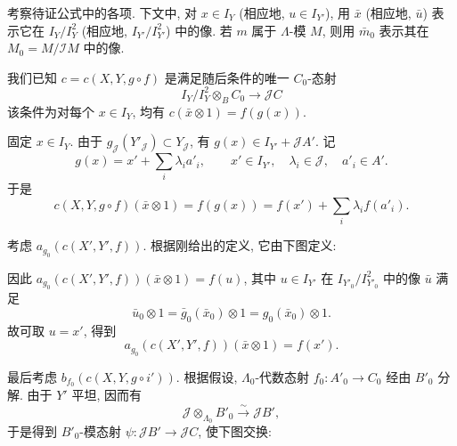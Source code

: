 \begin{center}
\end{center}

考察待证公式中的各项. 下文中, 对 \(x\in I_Y\)
(相应地, \(u\in I_{Y'}\)), 用 \(\bar x\) (相应地, \(\bar u\))
表示它在 \(I_Y/I_Y^2\) (相应地, \(I_{Y'}/I_{Y'}^2\)) 中的像.
若 \(m\) 属于 \(\Lambda\)-模 \(M\), 则用 \(\bar m_0\)
表示其在 \(M_0=M/\mathscr I M\) 中的像.

我们已知 \(c=c(X,Y,g\circ f)\) 是满足随后条件的唯一 \(C_0\)-态射
\[
 I_Y/I_Y^2\otimes_B C_0\longrightarrow\mathscr J C
\]
该条件为对每个 \(x\in I_Y\), 均有 \(c(\bar x\otimes1)=f(g(x))\).

固定 \(x\in I_Y\). 由于 \(g_{\mathscr J}(Y'_{\mathscr J})\subset
Y_{\mathscr J}\), 有 \(g(x)\in I_{Y'}+\mathscr J A'\). 记
\[
 g(x)=x'+\sum_i\lambda_i a'_i,
 \qquad x'\in I_{Y'},\quad \lambda_i\in\mathscr J,\quad a'_i\in A'.
\]
于是
\begin{equation*}
 \tag{1}\label{sga3:iii:proposition:4-13:equation:1}
 c(X,Y,g\circ f)(\bar x\otimes1)
 =f(g(x))=f(x')+\sum_i\lambda_i f(a'_i).
\end{equation*}

考虑 \(a_{g_0}(c(X',Y',f))\). 根据刚给出的定义, 它由下图定义:

\begin{center}
\end{center}

因此 \(a_{g_0}(c(X',Y',f))(\bar x\otimes1)=f(u)\),
其中 \(u\in I_{Y'}\) 在 \(I_{Y'_0}/I_{Y'_0}^2\) 中的像 \(\bar u\) 满足
\[
 \bar u_0\otimes1=\bar g_0(\bar x_0)\otimes1
 =g_0(\bar x_0)\otimes1.
\]
故可取 \(u=x'\), 得到
\begin{equation*}
 \tag{2}\label{sga3:iii:proposition:4-13:equation:2}
 a_{g_0}(c(X',Y',f))(\bar x\otimes1)=f(x').
\end{equation*}

最后考虑 \(b_{f_0}(c(X,Y,g\circ i'))\). 根据假设,
\(\Lambda_0\)-代数态射 \(f_0:A'_0\to C_0\) 经由 \(B'_0\) 分解.
由于 \(Y'\) 平坦, 因而有
\[
 \mathscr J\otimes_{\Lambda_0}B'_0\xrightarrow{\sim}\mathscr J B',
\]
于是得到 \(B'_0\)-模态射 \(\psi:\mathscr J B'\to\mathscr J C\),
使下图交换:

